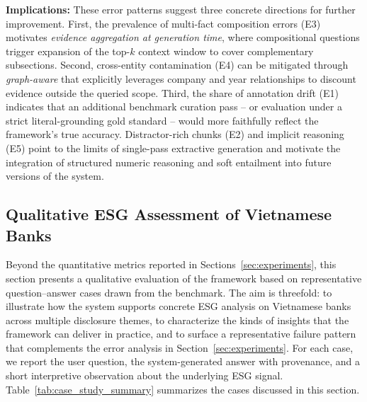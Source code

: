 \documentclass[sn-mathphys, oneside]{sn-jnl}
\begin{document}
\textbf{Implications: }These error patterns suggest three concrete directions for further improvement.
First, the prevalence of multi-fact composition errors (E3) motivates
\emph{evidence aggregation at generation time}, where compositional questions
trigger expansion of the top-$k$ context window to cover complementary subsections.
Second, cross-entity contamination (E4) can be mitigated through
\emph{graph-aware} that explicitly leverages company and year
relationships to discount evidence outside the queried scope. Third, the share
of annotation drift (E1) indicates that an additional benchmark curation pass --
or evaluation under a strict literal-grounding gold standard -- would more
faithfully reflect the framework's true accuracy. Distractor-rich chunks (E2)
and implicit reasoning (E5) point to the limits of single-pass extractive
generation and motivate the integration of structured numeric reasoning and
soft entailment into future versions of the system.

\subsection{Qualitative ESG Assessment of Vietnamese Banks}
\label{subsec:case-study}
 
Beyond the quantitative metrics reported in Sections~\ref{sec:experiments},
this section presents a qualitative evaluation of the framework based on
representative question--answer cases drawn from the benchmark. The aim is
threefold: to illustrate how the system supports concrete ESG analysis on
Vietnamese banks across multiple disclosure themes, to characterize the
kinds of insights that the framework can deliver in practice, and to surface
a representative failure pattern that complements the error analysis in
Section~\ref{sec:experiments}. For each case, we report the user question,
the system-generated answer with provenance, and a short interpretive
observation about the underlying ESG signal.
Table~\ref{tab:case_study_summary} summarizes the cases discussed in this
section.
 
\end{document}
